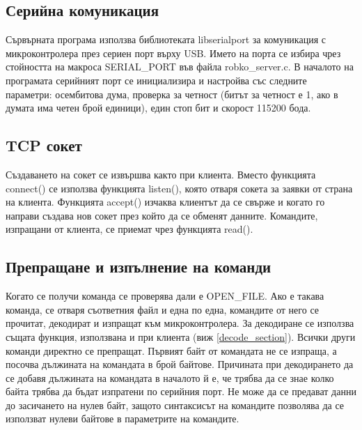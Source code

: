 \subsection{Серийна комуникация}
Сървърната програма използва библиотеката libserialport за комуникация с микроконтролера през сериен порт върху USB. Името на порта се избира чрез стойността на макроса SERIAL\_PORT във файла robko\_server.c. В началото на програмата серийният порт се инициализира и настройва със следните параметри: осембитова дума, проверка за четност (битът за четност е 1, ако в думата има четен брой единици), един стоп бит и скорост 115200 бода.
\subsection{TCP сокет}
Създаването на сокет се извършва както при клиента. Вместо функцията connect() се използва функцията listen(), която отваря сокета за заявки от страна на клиента. Функцията accept() изчаква клиентът да се свърже и когато го направи създава нов сокет през който да се обменят данните. Командите, изпращани от клиента, се приемат чрез функцията read().
\subsection{Препращане и изпълнение на команди}
Когато се получи команда се проверява дали е OPEN\_FILE. Ако е такава команда, се отваря съответния файл и една по една, командите от него се прочитат, декодират и изпращат към микроконтролера. За декодиране се използва същата функция, използвана и при клиента (виж \ref{decode_section}). Всички други команди директно се препращат. Първият байт от командата не се изпраща, а посочва дължината на командата в брой байтове. Причината при декодирането да се добавя дължината на командата в началото й е, че трябва да се знае колко байта трябва да бъдат изпратени по серийния порт. Не може да се предават данни до засичането на нулев байт, защото синтаксисът на командите позволява да се използват нулеви байтове в параметрите на командите.
